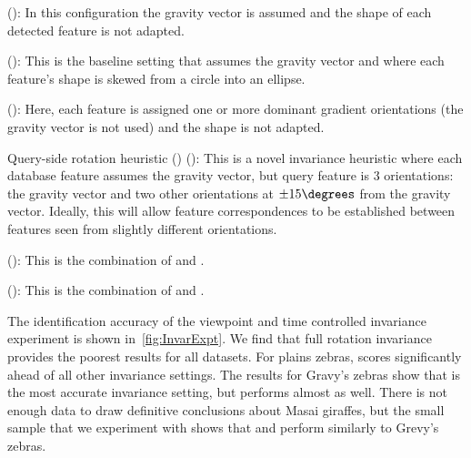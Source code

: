         \begin{itemln}

            \item \NoInvar{} (): %
            In this configuration the gravity vector is assumed and the
              shape of each detected feature is not adapted.

            \item \AIAlone{} (): %
            This is the baseline setting that assumes the gravity
              vector and where each feature's shape is skewed from a
              circle into an ellipse.

            \item \RIAlone{} (): %
            Here, each feature is assigned one or more dominant
              gradient orientations (the gravity vector is not used) and
              the shape is not adapted.

            \item Query-side rotation heuristic (\QRHCirc{})
              (): %
            This is a novel invariance heuristic where each {database}
              feature assumes the gravity vector, but {query} feature is
              $3$ orientations:
            the gravity vector and two other orientations at
              $\pm15\degrees$ from the gravity vector.
            Ideally, this will allow feature correspondences to be
              established between features seen from slightly different
              orientations.

            \item \QRHEll{} (): %
                This is the combination of \QRHCirc{} and \AIAlone{}.

            \item \AIRI{} (): %
                This is the combination of \RIAlone{} and \AIAlone{}.

        \end{itemln}

        The identification accuracy of the viewpoint and time
          controlled invariance experiment is shown
          in~\cref{fig:InvarExpt}.
        We find that full rotation invariance provides the poorest
          results for all datasets.
        For plains zebras, \QRHCirc{} scores significantly ahead of all
          other invariance settings.
        The results for Gravy's zebras show that \AIAlone{} is the most
          accurate invariance setting, but \QRHEll{} performs almost as
          well.
        There is not enough data to draw definitive conclusions about
          Masai giraffes, but the small sample that we experiment with
          shows that \AIAlone{} and \QRHEll{} perform similarly to
          Grevy's zebras.

